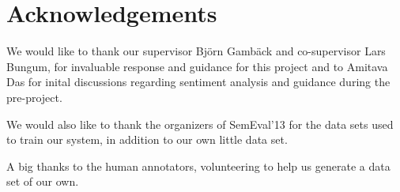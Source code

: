 \section*{Acknowledgements}

We would like to thank our supervisor Bj\"{o}rn Gamb\"{a}ck and co-supervisor Lars Bungum, for invaluable response and guidance for this project and to Amitava Das for inital discussions regarding sentiment analysis and guidance during the pre-project.

We would also like to thank the organizers of SemEval'13 for the data sets used to train our system, in addition to our own little data set. 

A big thanks to the human annotators, volunteering to help us generate a data set of our own.  

\cleardoublepage